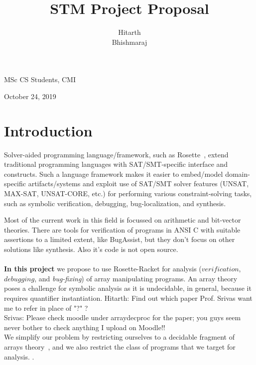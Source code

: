 \documentclass[a4paper, 12pt, notitlepage] {article}
\author{Hitarth \\ Bhishmaraj}
\title{STM Project Proposal}
\date{} %
\newcommand{\hide}[1]{}
\newcommand{\mscmt}[1]{{\color{blue} \tiny{Srivas: {#1}}}}
\newcommand{\hcmt}[1]{{\color{magenta} \tiny{Hitarth: {#1}}}}
\begin{document}
\maketitle		


\begin{center}
MSc CS Students, CMI
\end{center}
\begin{center}
October 24, 2019
\end{center}
\newpage

\section{Introduction}

Solver-aided programming language/framework, such as Rosette~\cite{??}, extend traditional programming languages with SAT/SMT-specific interface and constructs.
Such a language framework makes it easier to embed/model domain-specific artifacts/systems and exploit use of SAT/SMT solver features (UNSAT, MAX-SAT, UNSAT-CORE, etc.) for performing various constraint-solving tasks, such as symbolic verification, debugging, bug-localization, and synthesis.
%
\hide{
domain-specific languages (SDSLs) are the languages, for a specific domain, which ease the construction of programs by giving us the ability to automate the taksk like verification, debugging and synthesis. But implementing the SDSLs from the scretch is a very hard task. To simplify our taks, we use Rosette \cite{rosette_paper}. Rosette is a framework for designing solver-aided languages, and is itself a solver-aided language embedded in Racket. Rosette helps us to easily exploit the power of SAT//SMT solver in designing solutions to domain specific constraint solving problems.\\
\\
}
%
Most of the current work in this field is focussed on arithmetic and bit-vector theories. There are tools for verification of programs in ANSI C with suitable assertions to  a limited extent, like BugAssist\cite{bugassist}, but they don't focus on other solutions like synthesis. Also it's code is not open source.\\
 \\
{\bf In this project} we propose to use Rosette-Racket for analysis ($verification$, $debugging$, and \emph{bug-fixing}) of array manipulating programs.
An array theory poses a challenge for symbolic analysis as it is undecidable, in general, because it requires quantifier instantiation.
\hcmt{Find out which paper Prof. Srivas want me to refer in place of "?" ? }\\
\mscmt{Please check moodle under arraydecproc for the paper; you guys seem never bother to check anything I upload on Moodle!!}\\
We simplify our problem by restricting ourselves to a decidable fragment of arrays theory~\cite{??}, and we also restrict the class of programs that we target for analysis. .
\end{document}
